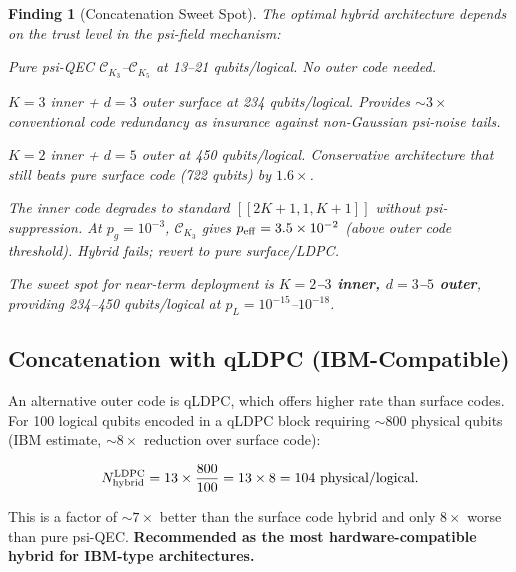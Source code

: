 \documentclass[11pt]{article}
\newtheorem{finding}[theorem]{Finding}
\theoremstyle{definition}
\theoremstyle{remark}
\newcommand{\CK}{\mathcal{C}_K}
\newcommand{\ee}[1]{\times 10^{#1}}
\newcommand{\lamdiff}{|\lambda-1|}
\begin{document}
\begin{finding}[Concatenation Sweet Spot]
\label{finding:sweet-spot}
The optimal hybrid architecture depends on the trust level in the
psi-field mechanism:

\begin{description}[leftmargin=2em]
  \item[High trust ($\lamdiff$ confirmed):] Pure psi-QEC $\CK_3$--$\CK_5$
    at 13--21 qubits/logical.  No outer code needed.
  \item[Moderate trust:] $K=3$ inner + $d=3$ outer surface at 234
    qubits/logical.  Provides $\sim 3\times$ conventional code redundancy
    as insurance against non-Gaussian psi-noise tails.
  \item[Low trust / early deployment:] $K=2$ inner + $d=5$ outer at
    450 qubits/logical.  Conservative architecture that still beats
    pure surface code (722 qubits) by $1.6\times$.
  \item[Zero trust ($\lamdiff = 0$):] The inner code degrades to
    standard $[[2K+1,1,K+1]]$ without psi-suppression.  At $p_g = 10^{-3}$,
    $\CK_3$ gives $p_{\rm eff} = 3.5\ee{-2}$ (above outer code threshold).
    Hybrid fails; revert to pure surface/LDPC.
\end{description}

The sweet spot for near-term deployment is \textbf{$K=2$--$3$ inner,
$d=3$--$5$ outer}, providing 234--450 qubits/logical at
$p_L = 10^{-15}$--$10^{-18}$.
\end{finding}

\subsection{Concatenation with qLDPC (IBM-Compatible)}
\label{sec:concat-ldpc}

An alternative outer code is qLDPC, which offers higher rate than
surface codes.  For 100 logical qubits encoded in a qLDPC block
requiring $\sim 800$ physical qubits (IBM estimate, $\sim 8\times$
reduction over surface code):

\begin{equation}
  N_{\rm hybrid}^{\rm LDPC} = 13 \times \frac{800}{100} = 13 \times 8
  = 104 \text{ physical/logical}.
\end{equation}

This is a factor of $\sim 7\times$ better than the surface code hybrid
and only $8\times$ worse than pure psi-QEC.  \textbf{Recommended as the
most hardware-compatible hybrid for IBM-type architectures.}
\end{document}
